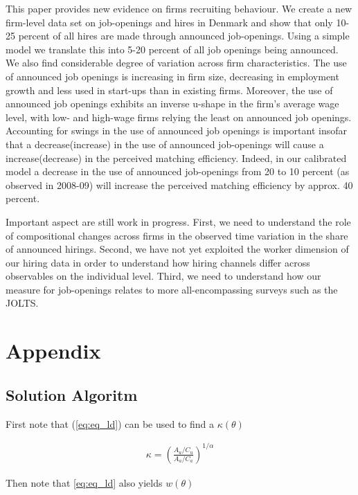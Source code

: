 \documentclass[11pt,article]{memoir}
\begin{document}
This paper provides new evidence on firms recruiting behaviour. We create a new firm-level data set on  job-openings and hires in Denmark and show that only 10-25 percent of all hires are made through announced job-openings. Using a simple model we translate this into 5-20 percent of all job openings being announced. 
We also find considerable degree of variation across firm characteristics. The use of announced job openings is increasing in firm size, decreasing in employment growth and less used in start-ups than in existing firms. Moreover, the use of announced job openings exhibits an inverse u-shape in the firm's average wage level, with low- and high-wage firms relying the least on announced job openings. Accounting for swings in the use of announced job openings is important insofar that a decrease(increase) in the use of announced job-openings will cause a increase(decrease) in the perceived matching efficiency. Indeed, in our calibrated model a decrease in the use of announced job-openings from 20 to 10 percent (as observed in 2008-09) will increase the perceived matching efficiency by approx. 40 percent.

Important aspect are still work in progress. First, we need to understand the role of compositional changes across firms in the observed time variation in the share of announced hirings. Second, we have not yet exploited the worker dimension of our hiring data in order to understand how hiring channels differ across  observables on the individual level. Third, we need to understand  how our measure for job-openings relates to more all-encompassing surveys such as the JOLTS. 

\newpage

\section{Appendix}

\subsection{Solution Algoritm}
\label{sec:solution_algoritm}

First note that (\ref{eq:eq_ld}) can be used to find a $\kappa(\theta)$

\begin{align}
\kappa = \left( \frac{A_u/C_u}{A_a/C_a}\right)^{1/\alpha}
\end{align}

Then note that \ref{eq:eq_ld} also yields $w(\theta)$
\end{document}
